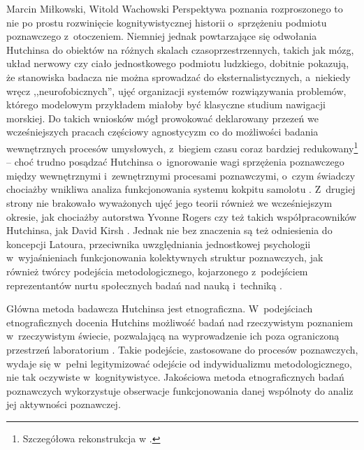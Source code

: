 \begin{artplenv2auth}{Marcin Miłkowski, Witold Wachowski}
Perspektywa poznania rozproszonego to nie po prostu rozwinięcie kognitywistycznej historii o~sprzężeniu podmiotu poznawczego z~otoczeniem. Niemniej jednak powtarzające się odwołania Hutchinsa do obiektów na różnych skalach czasoprzestrzennych, takich jak mózg, układ nerwowy czy ciało jednostkowego podmiotu ludzkiego, dobitnie pokazują, że stanowiska badacza nie można sprowadzać do eksternalistycznych, a~niekiedy wręcz ,,neurofobicznych'', ujęć organizacji systemów rozwiązywania problemów, którego modelowym przykładem miałoby być klasyczne studium nawigacji morskiej. Do takich wniosków mógł prowokować deklarowany przezeń we wcześniejszych pracach częściowy agnostycyzm co do możliwości badania wewnętrznych procesów umysłowych, z~biegiem czasu coraz bardziej redukowany\footnote{Szczegółowa rekonstrukcja w
\parencites[][s.~178–188]{afeltowicz_modele_2012}[][]{afeltowicz_how_2015}.%
} -- choć trudno posądzać Hutchinsa o~ignorowanie wagi sprzężenia poznawczego między wewnętrznymi i~zewnętrznymi procesami poznawczymi, o~czym świadczy chociażby wnikliwa analiza funkcjonowania systemu kokpitu samolotu 
\parencites[zob.][]{hutchins_how_1995}[][]{engestrom_distributed_1996}. %
 Z~drugiej strony nie brakowało wyważonych ujęć jego teorii również we wcześniejszym okresie, jak chociażby autorstwa Yvonne Rogers 
\parencite*[][]{rogers_brief_1997} %
 czy też takich współpracowników Hutchinsa, jak David Kirsh 
\parencite*[][]{kirsh_distributed_1999}. %
 Jednak nie bez znaczenia są też odniesienia do koncepcji Latoura, przeciwnika uwzględniania jednostkowej psychologii w~wyjaśnieniach funkcjonowania kolektywnych struktur poznawczych, jak również twórcy podejścia metodologicznego, kojarzonego z~podejściem reprezentantów nurtu społecznych badań nad nauką i~techniką 
\parencite[zob. np.][]{hess_ethnography_2001}.%


Główna metoda badawcza Hutchinsa jest etnograficzna. W~podejściach etnograficznych docenia Hutchins możliwość badań nad rzeczywistym poznaniem w~rzeczywistym świecie, pozwalającą na wyprowadzenie ich poza ograniczoną przestrzeń laboratorium
\parencite[][s.~43]{hutchins_cultural_2014}. %
 Takie podejście, zastosowane do procesów poznawczych, wydaje się w~pełni legitymizować odejście od indywidualizmu metodologicznego, nie tak oczywiste w~kognitywistyce. Jakościowa metoda etnograficznych badań poznawczych wykorzystuje obserwacje funkcjonowania danej wspólnoty do analiz jej aktywności poznawczej.


\end{artplenv2auth}
